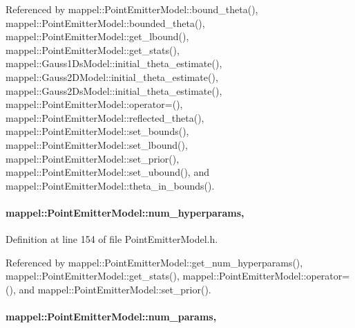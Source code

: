 Referenced by mappel\+::\+Point\+Emitter\+Model\+::bound\+\_\+theta(), mappel\+::\+Point\+Emitter\+Model\+::bounded\+\_\+theta(), mappel\+::\+Point\+Emitter\+Model\+::get\+\_\+lbound(), mappel\+::\+Point\+Emitter\+Model\+::get\+\_\+stats(), mappel\+::\+Gauss1\+Ds\+Model\+::initial\+\_\+theta\+\_\+estimate(), mappel\+::\+Gauss2\+D\+Model\+::initial\+\_\+theta\+\_\+estimate(), mappel\+::\+Gauss2\+Ds\+Model\+::initial\+\_\+theta\+\_\+estimate(), mappel\+::\+Point\+Emitter\+Model\+::operator=(), mappel\+::\+Point\+Emitter\+Model\+::reflected\+\_\+theta(), mappel\+::\+Point\+Emitter\+Model\+::set\+\_\+bounds(), mappel\+::\+Point\+Emitter\+Model\+::set\+\_\+lbound(), mappel\+::\+Point\+Emitter\+Model\+::set\+\_\+prior(), mappel\+::\+Point\+Emitter\+Model\+::set\+\_\+ubound(), and mappel\+::\+Point\+Emitter\+Model\+::theta\+\_\+in\+\_\+bounds().

\paragraph[{\texorpdfstring{num\+\_\+hyperparams}{num_hyperparams}}]{ mappel\+::\+Point\+Emitter\+Model\+::num\+\_\+hyperparams\hspace{0.3cm}{\ttfamily [protected]}, {\ttfamily [inherited]}}\hypertarget{classmappel_1_1PointEmitterModel_ab2423214fdd81c8212118770b5b17b1f}{}\label{classmappel_1_1PointEmitterModel_ab2423214fdd81c8212118770b5b17b1f}


Definition at line 154 of file Point\+Emitter\+Model.\+h.



Referenced by mappel\+::\+Point\+Emitter\+Model\+::get\+\_\+num\+\_\+hyperparams(), mappel\+::\+Point\+Emitter\+Model\+::get\+\_\+stats(), mappel\+::\+Point\+Emitter\+Model\+::operator=(), and mappel\+::\+Point\+Emitter\+Model\+::set\+\_\+prior().

\paragraph[{\texorpdfstring{num\+\_\+params}{num_params}}]{ mappel\+::\+Point\+Emitter\+Model\+::num\+\_\+params\hspace{0.3cm}{\ttfamily [protected]}, {\ttfamily [inherited]}}\hypertarget{classmappel_1_1PointEmitterModel_a9af0484391bd6021ddc04ac666ab49ad}{}\label{classmappel_1_1PointEmitterModel_a9af0484391bd6021ddc04ac666ab49ad}


